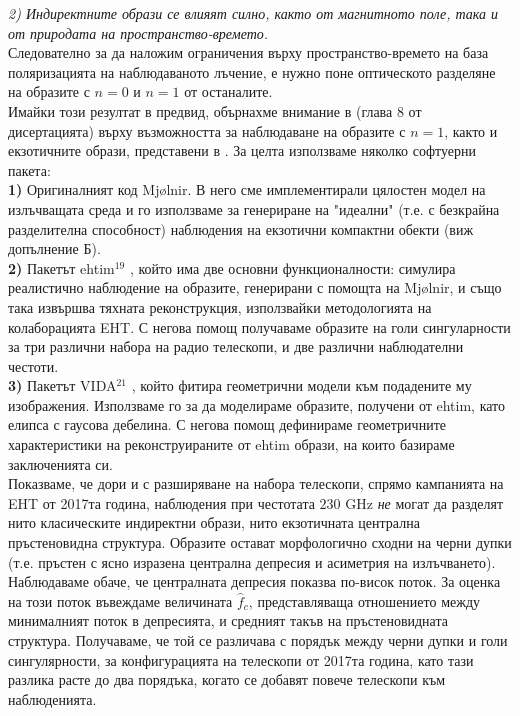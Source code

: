 \emph{2) Индиректните образи се влияят силно, както от магнитното поле, така и от природата на пространство-времето.}\\

Следователно за да наложим ограничения върху пространство-времето на база поляризацията на наблюдаваното лъчение, е нужно поне оптическото разделяне на образите с $n = 0$ и $n = 1$ от останалите.\\

Имайки този резултат в предвид, обърнахме внимание в \cite{Deliyski2024} (глава 8 от дисертацията) върху възможността за наблюдаване на образите с $n = 1$, както и екзотичните образи, представени в \cite{Deliyski2022}\cite{Gyulchev2020}\cite{Gyulchev2021}. За целта използваме няколко софтуерни пакета:\\

\textbf{1)} Оригиналният код Mjølnir. В него сме имплементирали цялостен модел на излъчващата среда и го използваме за генериране на "идеални" (т.е. с безкрайна разделителна способност) наблюдения на екзотични компактни обекти (виж допълнение Б).\\

\textbf{2)} Пакетът ehtim$^{19}$ \cite{EHTIM}, който има две основни функционалности: симулира реалистично наблюдение на образите, генерирани с помощта на Mjølnir, и също така извършва тяхната реконструкция, използвайки методологията на колаборацията EHT. С негова помощ получаваме образите на голи сингуларности за три различни набора на радио телескопи, и две различни наблюдателни честоти.\\

\textbf{3)} Пакетът VIDA$^{21}$ \cite{VIDA}, който фитира геометрични модели към подадените му изображения. Използваме го за да моделираме образите, получени от ehtim, като елипса с гаусова дебелина. С негова помощ дефинираме геометричните характеристики на реконструираните от ehtim образи, на които базираме заключенията си.\\

Показваме, че дори и с разширяване на набора телескопи, спрямо кампанията на EHT от 2017та година, наблюдения при честотата $230$ GHz \emph{не} могат да разделят нито класическите индиректни образи, нито екзотичната централна пръстеновидна структура. Образите остават морфологично сходни на черни дупки (т.е. пръстен с ясно изразена централна депресия и асиметрия на излъчването). Наблюдаваме обаче, че централната депресия показва по-висок поток. За оценка на този поток въвеждаме величината $\hat{f}_c$, представляваща отношението между минималният поток в депресията, и средният такъв на пръстеновидната структура. Получаваме, че той се различава с порядък между черни дупки и голи сингулярности, за конфигурацията на телескопи от 2017та година, като тази разлика расте до два порядъка, когато се добавят повече телескопи към наблюденията.\\

